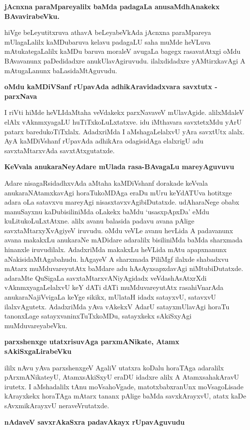 {\bf jAcnxna paraMpareyalilx baMda padagaLa anusaMdhAnakekx BAvavirabeVku.}

hiVge beLeyutitxruva athavA beLeyabeVkAda jAcnxna paraMpareya mUlagaLalilx kaMDubaruva kelavu padagaLU saha muMde heVLuva mAtukategaLalilx kaMDu baruva moraleV avugaLa bagegx rasavatAtxgi oMdu BAvavanunx paDedidadxre anukUlavAgiruvudu. ilalxdidadxre yAMtirxkavAgi A mAtugaLanunx baLasidaMtAguvudu.

{\bf oMdu kaMDiVSanf rUpavAda adhikAravidadxvara savxtutx - parxNava}

I riVti hiMde heVLIdaMtaha veVdakekx parxNavaveV mUlavAgide. alilxMdaleV elAlx vAknmxyagaLU huTiTxkoLuLxtatxve. idu iMthavara savxtetxMdu yArU patarx baredukoTiTxlalx. AdadxriMda I aMshagaLelalxvU yAra savxtUtx alalx. AyA kaMDiVshanf rUpavAda adhikAra odagisidAga elalxrigU adu savxtaMtarxvAda savxtAtxgutatxde.

{\bf KeVvala anukaraNeyAdare mUlada rasa-BAvagaLu mareyAguvuvu}

Adare nisagaRsidadhxvAda aMtaha kaMDiVshanf dorakade keVvala anukaraNAtamxkavAgi horaTukoMDAga eraDu mUru keYdATUva hotitxge adara oLa satavxvu mareyAgi nisasxtavxvAgibiDutatxde. udAharaNege obabx manuSayxnu kaDubisiliniMda oLakekx baMdu `usasxpApxDa' eMdu kuLitukoLuLxtAtxne. alilx avanu balasida padavu avana pAlige savxtaMtarxyXvAgiyeV iruvudu. oMdu veVLe avanu hevLida A padavanunx avana makakxLu anukaraNe mADidare adaralilx bisiliniMda baMda sharxmada hinanxle iruvudilalx. AdadxriMda makakxLu heVLida mAtu apapxnanunx aNakisidaMtAgabahudu. hAgayeV A sharxmada PiliMgf ilalxde shabadxvu mAtarx muMduvareyutAtx baMdare adu hAsAyxsapxdavAgi niMtubiDutatxde. adaraMte QuSigaLa savxtaMtarxvANiyAgidadx veVdashAsAtxrXdi vAknmxyagaLelalxvU keY dATi dATi muMduvareyutAtx rasahiVnarAda anukaraNajiVvigaLa keYge sikikx, mUlataH idadx satayxvU, satavxvU ilalxvAgutetx. AdadxriMda yAva vAkekxV AdarU satayxmUlavAgi horaTu tanonxLage satayxvaninxTuTxkoMDu, satayxkekx sAkiSxyAgi muMduvareyabeVku.

{\bf parxshenxge utatxrisuvAga parxmANikate, Atamx sAkiSxgaLirabeVku}

ililx nAvu yAva parxshenxgeV AgaliV utatxra koDalu horaTAga adaralilx pArxmANikateyU, AtamxsAkiSxyU eraDU idadxre alilx A AtamxsahakAravU irutetx. I aMshadalilx tAnu moVsahoVgade, matotxbabxranUnx moVsagoLisade kArayxkekx horaTAga mAtarx tananx pAlige baMda savxkArayxvU, atatx kaDe sAvxmikArayxvU neraveVrutatxde.

{\bf nAdaveV savxrAkaSxra padavAkayx rUpavAguvudu}

